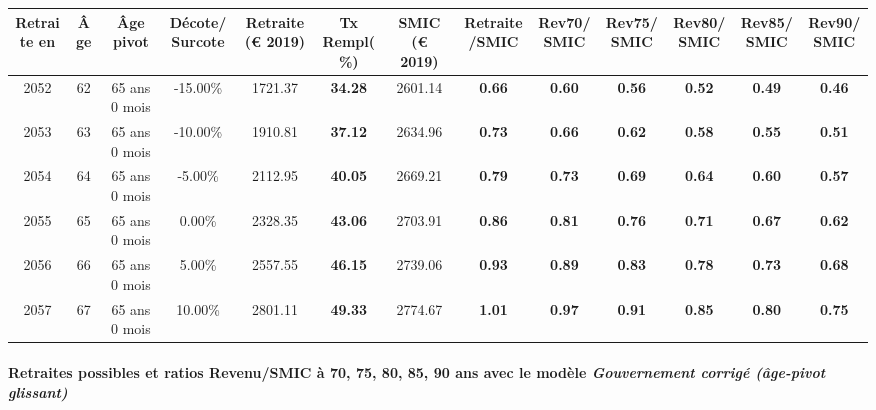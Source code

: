 { \scriptsize \begin{center} 
\begin{tabular}[htb]{|c|c||c|c||c|c||c||c|c|c|c|c|c|} 
\hline 
 Retraite en &  Âge &  Âge pivot &  Décote/Surcote &  Retraite (\euro{} 2019) &  Tx Rempl(\%) &  SMIC (\euro{} 2019) &  Retraite/SMIC &  Rev70/SMIC &  Rev75/SMIC &  Rev80/SMIC &  Rev85/SMIC &  Rev90/SMIC \\ 
\hline \hline 
 2052 &  62 &  65 ans 0 mois &  -15.00\% &  1721.37 &  {\bf 34.28} &  2601.14 &  {\bf {\color{red} 0.66}} &  {\bf {\color{red} 0.60}} &  {\bf {\color{red} 0.56}} &  {\bf {\color{red} 0.52}} &  {\bf {\color{red} 0.49}} &  {\bf {\color{red} 0.46}} \\ 
\hline 
 2053 &  63 &  65 ans 0 mois &  -10.00\% &  1910.81 &  {\bf 37.12} &  2634.96 &  {\bf {\color{red} 0.73}} &  {\bf {\color{red} 0.66}} &  {\bf {\color{red} 0.62}} &  {\bf {\color{red} 0.58}} &  {\bf {\color{red} 0.55}} &  {\bf {\color{red} 0.51}} \\ 
\hline 
 2054 &  64 &  65 ans 0 mois &  -5.00\% &  2112.95 &  {\bf 40.05} &  2669.21 &  {\bf {\color{red} 0.79}} &  {\bf {\color{red} 0.73}} &  {\bf {\color{red} 0.69}} &  {\bf {\color{red} 0.64}} &  {\bf {\color{red} 0.60}} &  {\bf {\color{red} 0.57}} \\ 
\hline 
 2055 &  65 &  65 ans 0 mois &  0.00\% &  2328.35 &  {\bf 43.06} &  2703.91 &  {\bf {\color{red} 0.86}} &  {\bf {\color{red} 0.81}} &  {\bf {\color{red} 0.76}} &  {\bf {\color{red} 0.71}} &  {\bf {\color{red} 0.67}} &  {\bf {\color{red} 0.62}} \\ 
\hline 
 2056 &  66 &  65 ans 0 mois &  5.00\% &  2557.55 &  {\bf 46.15} &  2739.06 &  {\bf {\color{red} 0.93}} &  {\bf {\color{red} 0.89}} &  {\bf {\color{red} 0.83}} &  {\bf {\color{red} 0.78}} &  {\bf {\color{red} 0.73}} &  {\bf {\color{red} 0.68}} \\ 
\hline 
 2057 &  67 &  65 ans 0 mois &  10.00\% &  2801.11 &  {\bf 49.33} &  2774.67 &  {\bf 1.01} &  {\bf {\color{red} 0.97}} &  {\bf {\color{red} 0.91}} &  {\bf {\color{red} 0.85}} &  {\bf {\color{red} 0.80}} &  {\bf {\color{red} 0.75}} \\ 
\hline 
\hline 
\end{tabular} 
\end{center} } 
\paragraph{Retraites possibles et ratios Revenu/SMIC à 70, 75, 80, 85, 90 ans avec le modèle \emph{Gouvernement corrigé (âge-pivot glissant)}}  
 
